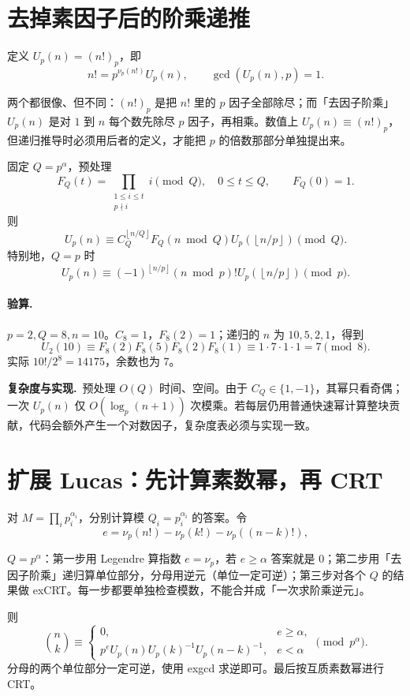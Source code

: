\documentclass[UTF8,a4paper,11pt,twoside,openright,fontset=fandol]{ctexbook}
\theoremstyle{definition}
\newcommand{\floor}[1]{\left\lfloor #1\right\rfloor}
\newcommand{\cost}{\par\noindent\textbf{复杂度与实现.}\ }
\begin{document}
\section{去掉素因子后的阶乘递推}
定义 $U_p(n)=(n!)_p$，即
\[
 n!=p^{\nu_p(n!)}U_p(n),\qquad\gcd(U_p(n),p)=1.
\]

\begin{tip}[$(n!)_p$ 与 $U_p(n)$ 的区别]
两个都很像、但不同：$(n!)_p$ 是把 $n!$ 里的 $p$ 因子全部除尽；而「去因子阶乘」$U_p(n)$ 是对 $1$ 到 $n$ 每个数先除尽 $p$ 因子，再相乘。数值上 $U_p(n)\equiv(n!)_p$，但递归推导时必须用后者的定义，才能把 $p$ 的倍数那部分单独提出来。
\end{tip}

固定 $Q=p^\alpha$，预处理
\[
 F_Q(t)=\prod_{\substack{1\le i\le t\\p\nmid i}}i\pmod Q,\quad0\le t\le Q,\qquad F_Q(0)=1.
\]
则
\[
 U_p(n)\equiv C_Q^{\floor{n/Q}}F_Q(n\bmod Q)
 U_p(\floor{n/p})\pmod Q.
\]
特别地，$Q=p$ 时
\[
 U_p(n)\equiv(-1)^{\floor{n/p}}(n\bmod p)!
 U_p(\floor{n/p})\pmod p.
\]

\paragraph{验算.} $p=2,Q=8,n=10$。$C_8=1$，$F_8(2)=1$；递归的 $n$ 为 $10,5,2,1$，得到
\[
 U_2(10)\equiv F_8(2)F_8(5)F_8(2)F_8(1)
 \equiv1\cdot7\cdot1\cdot1=7\pmod8.
\]
实际 $10!/2^8=14175$，余数也为 $7$。
\cost 预处理 $O(Q)$ 时间、空间。由于 $C_Q\in\{1,-1\}$，其幂只看奇偶；一次 $U_p(n)$ 仅 $O(\log_p(n+1))$ 次模乘。若每层仍用普通快速幂计算整块贡献，代码会额外产生一个对数因子，复杂度表必须与实现一致。


\section{扩展 Lucas：先计算素数幂，再 CRT}
对 $M=\prod_i p_i^{\alpha_i}$，分别计算模 $Q_i=p_i^{\alpha_i}$ 的答案。令
\[
 e=\nu_p(n!)-\nu_p(k!)-\nu_p((n-k)!),
\]

\begin{tip}[三步流程]
$Q=p^\alpha$：第一步用 Legendre 算指数 $e=\nu_p$，若 $e\ge\alpha$ 答案就是 $0$；第二步用「去因子阶乘」递归算单位部分，分母用逆元（单位一定可逆）；第三步对各个 $Q$ 的结果做 exCRT。每一步都要单独检查模数，不能合并成「一次求阶乘逆元」。
\end{tip}

则
\[
\binom nk\equiv
\begin{cases}
0,&e\ge\alpha,\\
p^eU_p(n)U_p(k)^{-1}U_p(n-k)^{-1},&e<\alpha
\end{cases}\pmod{p^\alpha}.
\]
分母的两个单位部分一定可逆，使用 exgcd 求逆即可。最后按互质素数幂进行 CRT。
\end{document}
